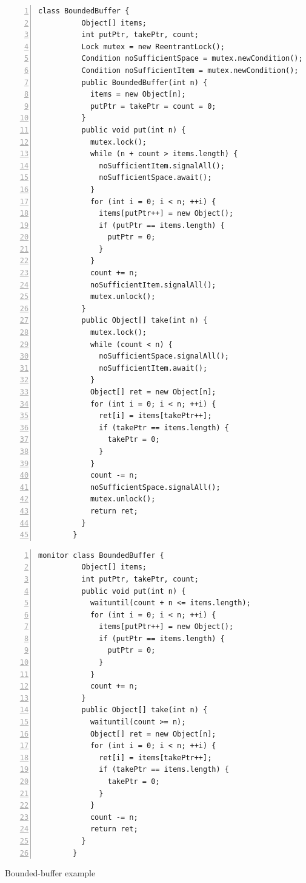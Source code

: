 \documentclass[preprint]{sigplanconf}
\begin{document}
\begin{figure}[ht!]
\begin{multicols}{2}
    \begin{Verbatim}[fontsize=\footnotesize,gobble=8,frame=topline,
            framesep=5mm,numbers=left,numbersep=2pt,
            label=\fbox{\small\emph{Explicit-Signal Bounded Buffer with
            a Parameter}}]
        class BoundedBuffer {
          Object[] items;  
          int putPtr, takePtr, count;
          Lock mutex = new ReentrantLock();
          Condition noSufficientSpace = mutex.newCondition();
          Condition noSufficientItem = mutex.newCondition();
          public BoundedBuffer(int n) {
            items = new Object[n];
            putPtr = takePtr = count = 0;
          }
          public void put(int n) {
            mutex.lock();
            while (n + count > items.length) {
              noSufficientItem.signalAll();
              noSufficientSpace.await();
            }
            for (int i = 0; i < n; ++i) {
              items[putPtr++] = new Object();
              if (putPtr == items.length) {
                putPtr = 0;
              }
            }
            count += n;
            noSufficientItem.signalAll();
            mutex.unlock();
          }
          public Object[] take(int n) {
            mutex.lock();
            while (count < n) {
              noSufficientSpace.signalAll();
              noSufficientItem.await();
            }
            Object[] ret = new Object[n];
            for (int i = 0; i < n; ++i) {
              ret[i] = items[takePtr++];
              if (takePtr == items.length) {
                takePtr = 0;
              }
            }
            count -= n;
            noSufficientSpace.signalAll();
            mutex.unlock();
            return ret;
          }
        }
    \end{Verbatim}
    \begin{Verbatim}[fontsize=\footnotesize,gobble=8,frame=lines,framesep=5mm,
            numbers=left,numbersep=2pt,
            label=\fbox{\small\emph{Implicit-Signal Bounded Buffer with a
            Parameter}}]
        monitor class BoundedBuffer { 
          Object[] items; 
          int putPtr, takePtr, count; 
          public void put(int n) { 
            waituntil(count + n <= items.length); 
            for (int i = 0; i < n; ++i) {
              items[putPtr++] = new Object(); 
              if (putPtr == items.length) { 
                putPtr = 0; 
              } 
            }
            count += n; 
          } 
          public Object[] take(int n) { 
            waituntil(count >= n);
            Object[] ret = new Object[n];
            for (int i = 0; i < n; ++i) {
              ret[i] = items[takePtr++]; 
              if (takePtr == items.length) { 
                takePtr = 0; 
              }
            }
            count -= n;
            return ret;
          }
        }
    \end{Verbatim}
\end{multicols}
  \caption{Bounded-buffer example}
  \label{fig:npc_exp}
\end{figure}
\end{document}
